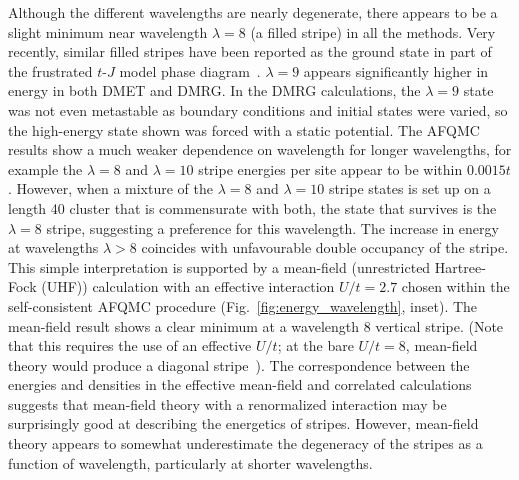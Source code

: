 \documentclass[12pt]{article}
\begin{document}
Although the different wavelengths are nearly degenerate, there appears
to be a slight  minimum near wavelength $\lambda=8$ (a filled stripe) in all the methods.
Very recently, similar filled stripes have been reported as the ground state in part of the frustrated $t$-$J$ model
phase diagram~\cite{dodaro2016intertwined}.
 $\lambda=9$ appears significantly higher in energy in both  DMET and DMRG.
In the DMRG calculations, the $\lambda=9$ state was not even metastable as boundary 
conditions and initial states were varied, so the high-energy state shown was forced with a static potential.
The AFQMC results show a much weaker dependence on wavelength for longer wavelengths, 
for example the $\lambda=8$ and $\lambda=10$
stripe energies per site appear to be within $0.0015t$. 
However, when a mixture of the $\lambda=8$ and $\lambda=10$ stripe states
is set up on a length 40 cluster that is commensurate with both, 
the state that survives is the $\lambda=8$ stripe, suggesting
a preference for this wavelength.
The increase in energy at wavelengths $\lambda > 8$ coincides with
unfavourable double occupancy of the stripe. This simple interpretation
is supported by a  mean-field (unrestricted Hartree-Fock (UHF)) calculation with an effective interaction $U/t=2.7$ chosen within
the self-consistent AFQMC procedure (Fig.~\ref{fig:energy_wavelength}, inset). The mean-field result shows a clear minimum at
a wavelength $8$ vertical stripe. (Note that this requires the use of an effective $U/t$; at the bare $U/t=8$, mean-field theory
would produce a diagonal stripe~\cite{Jie2013jpcm}). 
The correspondence between the energies and densities in the effective mean-field 
and correlated calculations suggests that  mean-field theory with a renormalized interaction may be surprisingly 
good at describing the energetics of stripes. 
However, mean-field theory appears to somewhat underestimate the degeneracy
of the stripes as a function of wavelength, particularly at shorter wavelengths. 
\end{document}

